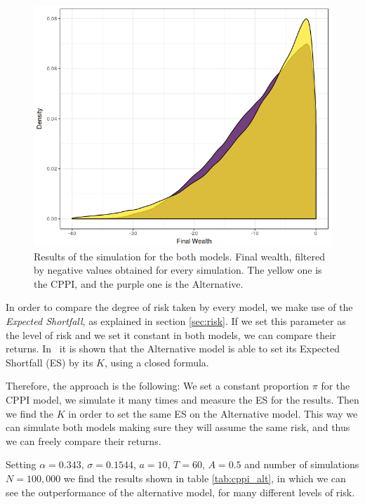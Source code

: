 \begin{figure}[H]
    \centering
    \includegraphics[scale=0.5]{./images/loss_both.png}
    \caption{Results of the simulation for the both models. Final wealth, filtered by negative values obtained for every simulation. The yellow one is the CPPI, and the purple one is the Alternative.}
    \label{fig:loss_both}
\end{figure}

In order to compare the degree of risk taken by every model, we make use of the \textit{Expected Shortfall}, as explained in section \ref{sec:risk}. If we set this parameter as the level of risk and we set it constant in both models, we can compare their returns. In~\cite{a:guillen-optimisation} it is shown that the Alternative model is able to set its Expected Shortfall (ES) by its $K$, using a closed formula.

Therefore, the approach is the following: We set a constant proportion $\pi$ for the CPPI model, we simulate it many times and measure the ES for the results. Then we find the $K$ in order to set the same ES on the Alternative model. This way we can simulate both models making sure they will assume the same risk, and thus we can freely compare their returns.

Setting $\alpha = 0.343$, $\sigma = 0.1544$, $a = 10$, $T = 60$, $A = 0.5$ and number of simulations $N = 100,000$ we find the results shown in table \ref{tab:cppi_alt}, in which we can see the outperformance of the alternative model, for many different levels of risk.

